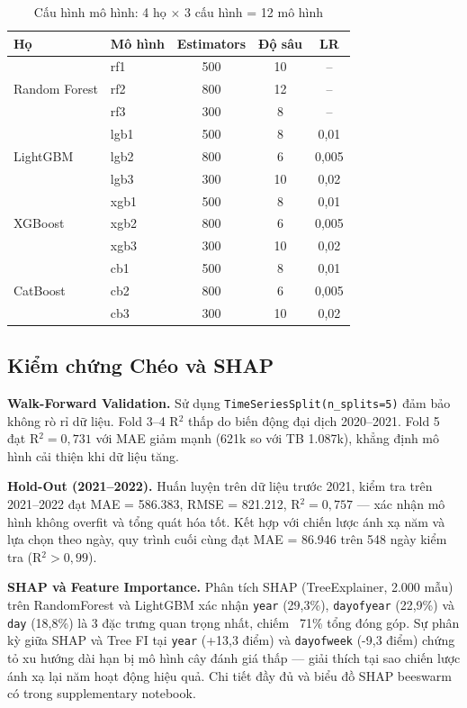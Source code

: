 \documentclass{article}
\begin{document}
\begin{table}[h]
  \caption{Cấu hình mô hình: 4 họ $\times$ 3 cấu hình = 12 mô hình}
  \label{tab:models}
  \centering
  \begin{tabular}{llccc}
    \toprule
    Họ & Mô hình & Estimators & Độ sâu & LR \\
    \midrule
    \multirow{3}{*}{Random Forest} & rf1 & 500 & 10 & -- \\
     & rf2 & 800 & 12 & -- \\
     & rf3 & 300 & 8 & -- \\
    \midrule
    \multirow{3}{*}{LightGBM} & lgb1 & 500 & 8 & 0,01 \\
     & lgb2 & 800 & 6 & 0,005 \\
     & lgb3 & 300 & 10 & 0,02 \\
    \midrule
    \multirow{3}{*}{XGBoost} & xgb1 & 500 & 8 & 0,01 \\
     & xgb2 & 800 & 6 & 0,005 \\
     & xgb3 & 300 & 10 & 0,02 \\
    \midrule
    \multirow{3}{*}{CatBoost} & cb1 & 500 & 8 & 0,01 \\
     & cb2 & 800 & 6 & 0,005 \\
     & cb3 & 300 & 10 & 0,02 \\
    \bottomrule
  \end{tabular}
\end{table}

\subsection{Kiểm chứng Chéo và SHAP}

\textbf{Walk-Forward Validation.} Sử dụng \texttt{TimeSeriesSplit(n\_splits=5)} đảm bảo không rò rỉ dữ liệu. Fold 3--4 R$^2$ thấp do biến động đại dịch 2020--2021. Fold 5 đạt R$^2 = 0{,}731$ với MAE giảm mạnh (621k so với TB 1.087k), khẳng định mô hình cải thiện khi dữ liệu tăng.

\textbf{Hold-Out (2021--2022).} Huấn luyện trên dữ liệu trước 2021, kiểm tra trên 2021--2022 đạt MAE = 586.383, RMSE = 821.212, R$^2 = 0{,}757$ — xác nhận mô hình không overfit và tổng quát hóa tốt. Kết hợp với chiến lược ánh xạ năm và lựa chọn theo ngày, quy trình cuối cùng đạt MAE = 86.946 trên 548 ngày kiểm tra (R$^2 > 0{,}99$).

\textbf{SHAP và Feature Importance.} Phân tích SHAP (TreeExplainer, 2.000 mẫu) trên RandomForest và LightGBM xác nhận \texttt{year} (29,3\%), \texttt{dayofyear} (22,9\%) và \texttt{day} (18,8\%) là 3 đặc trưng quan trọng nhất, chiếm ~71\% tổng đóng góp. Sự phân kỳ giữa SHAP và Tree FI tại \texttt{year} (+13,3 điểm) và \texttt{dayofweek} (-9,3 điểm) chứng tỏ xu hướng dài hạn bị mô hình cây đánh giá thấp — giải thích tại sao chiến lược ánh xạ lại năm hoạt động hiệu quả. Chi tiết đầy đủ và biểu đồ SHAP beeswarm có trong supplementary notebook.
\end{document}
